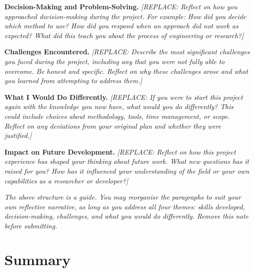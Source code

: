 \noindent\textbf{Decision-Making and Problem-Solving.}
\textit{[REPLACE: Reflect on how you approached decision-making during the 
project. For example: How did you decide which method to use? How did you 
respond when an approach did not work as expected? What did this teach you 
about the process of engineering or research?]}

\noindent\textbf{Challenges Encountered.}
\textit{[REPLACE: Describe the most significant challenges you faced during 
the project, including any that you were not fully able to overcome. Be honest 
and specific. Reflect on why these challenges arose and what you learned 
from attempting to address them.]}

\noindent\textbf{What I Would Do Differently.}
\textit{[REPLACE: If you were to start this project again with the knowledge 
you now have, what would you do differently? This could include choices about 
methodology, tools, time management, or scope. Reflect on any deviations from 
your original plan and whether they were justified.]}

\noindent\textbf{Impact on Future Development.}
\textit{[REPLACE: Reflect on how this project experience has shaped your 
thinking about future work. What new questions has it raised for you? How has 
it influenced your understanding of the field or your own capabilities as a 
researcher or developer?]}

\bigskip
\noindent\textit{The above structure is a guide. You may reorganise the 
paragraphs to suit your own reflective narrative, as long as you address all 
four themes: skills developed, decision-making, challenges, and what you would 
do differently. Remove this note before submitting.}

\section{Summary}
\label{sec:reflection_summary}

